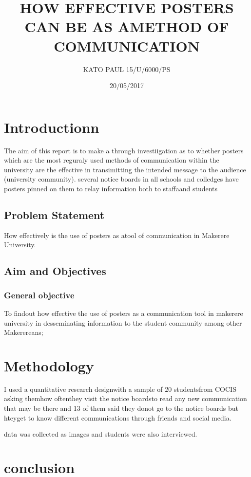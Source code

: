 \documentclass{article}
\title{HOW EFFECTIVE POSTERS CAN BE AS AMETHOD OF COMMUNICATION}
\author{ KATO PAUL 15/U/6000/PS}
\date{20/05/2017}
\begin{document}
  \maketitle


  \section{Introductionn}
The aim of this report is to make a through investiigation as to whether posters which are the most reguraly used methods of communication within the university are the effective in transimitting the intended message to the audience (university community). several notice boards in all schools and colledges have posters pinned on them  to relay information both to staffaand students
      	


	\subsection{ Problem Statement}

How effectively is the use of posters as atool of communication in Makerere University.
	\subsection{Aim and Objectives}

	\subsubsection{  General objective}


To findout how effective the use of posters as a communication tool in makerere university in desseminating information to 
the student community among other Makerereans;
	
	
 \section{ Methodology}
I used a quantitative research designwith a sample of 20 studentsfrom COCIS asking themhow oftenthey visit the notice boardsto read any new communication that may be there and 13 of them said they donot go to the notice boards but hteyget to know different communications through friends and social media.

data was collected as images  and students were also interviewed.
 \section{conclusion}
\end{document}
